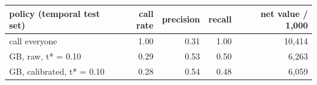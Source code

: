 \begin{tabular}{lrrrr}
\toprule
policy (temporal test set) & call rate & precision & recall & net value / 1,000 \\
\midrule
call everyone & 1.00 & 0.31 & 1.00 & 10,414 \\
GB, raw, t* = 0.10 & 0.29 & 0.53 & 0.50 & 6,263 \\
GB, calibrated, t* = 0.10 & 0.28 & 0.54 & 0.48 & 6,059 \\
\bottomrule
\end{tabular}